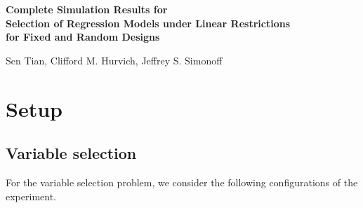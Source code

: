 \documentclass{article}
\newcommand{\beginsupplement}{%
        \setcounter{table}{0}
        \renewcommand{\thetable}{S\arabic{table}}%
        \setcounter{figure}{0}
        \renewcommand{\thefigure}{S\arabic{figure}}%
        \setcounter{page}{0}
        \renewcommand{\theequation}{S.\arabic{equation}}%
        \setcounter{equation}{0}
     }
\begin{document}
\def\spacingset#1{\renewcommand{\baselinestretch}%
{#1}\small\normalsize} \spacingset{1}


\beginsupplement
\appendix
{}
\begin{center}
\textbf{\large Complete Simulation Results for \\
Selection of Regression Models under Linear Restrictions \\ for Fixed and Random Designs}

Sen Tian, Clifford M. Hurvich, Jeffrey S. Simonoff
\end{center}


\section{Setup}
\subsection{Variable selection}
For the variable selection problem, we consider the following configurations of the experiment.
\end{document}
